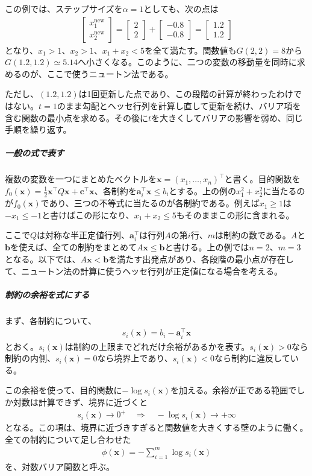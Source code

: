\documentclass[a4j]{jarticle}
\begin{document}
この例では、ステップサイズを$\alpha=1$としても、次の点は
\begin{align}
  \begin{bmatrix}x_1^{\mathrm{new}}\\x_2^{\mathrm{new}}\end{bmatrix}
  =\begin{bmatrix}2\\2\end{bmatrix}
   +\begin{bmatrix}-0.8\\-0.8\end{bmatrix}
  =\begin{bmatrix}1.2\\1.2\end{bmatrix}
\end{align}
となり、$x_1>1$、$x_2>1$、$x_1+x_2<5$を全て満たす。関数値も$G(2,2)=8$から$G(1.2,1.2)\simeq5.14$へ小さくなる。このように、二つの変数の移動量を同時に求めるのが、ここで使うニュートン法である。

ただし、$(1.2,1.2)$は1回更新した点であり、この段階の計算が終わったわけではない。$t=1$のまま勾配とヘッセ行列を計算し直して更新を続け、バリア項を含む関数の最小点を求める。その後に$t$を大きくしてバリアの影響を弱め、同じ手順を繰り返す。

\subparagraph{一般の式で表す}
複数の変数を一つにまとめたベクトルを$\bm{x}=(x_1,\ldots,x_n)^\top$と書く。目的関数を$f_0(\bm{x})=\frac12\bm{x}^\top Q\bm{x}+\bm{c}^\top \bm{x}$、各制約を$\bm{a}_i^\top \bm{x}\le b_i$とする。上の例の$x_1^2+x_2^2$に当たるのが$f_0(\bm{x})$であり、三つの不等式に当たるのが各制約である。例えば$x_1\ge1$は$-x_1\le-1$と書けばこの形になり、$x_1+x_2\le5$もそのままこの形に含まれる。

ここで$Q$は対称な半正定値行列、$\bm{a}_i^\top$は行列$A$の第$i$行、$m$は制約の数である。$A$と$\bm{b}$を使えば、全ての制約をまとめて$A\bm{x}\le \bm{b}$と書ける。上の例では$n=2$、$m=3$となる。以下では、$A\bm{x}<\bm{b}$を満たす出発点があり、各段階の最小点が存在して、ニュートン法の計算に使うヘッセ行列が正定値になる場合を考える。

\subparagraph{制約の余裕を式にする}
まず、各制約について、
\begin{align}
  s_i(\bm{x})=b_i-\bm{a}_i^\top \bm{x}
  \label{eq:barrier-slack}
\end{align}
とおく。$s_i(\bm{x})$は制約の上限までどれだけ余裕があるかを表す。$s_i(\bm{x})>0$なら制約の内側、$s_i(\bm{x})=0$なら境界上であり、$s_i(\bm{x})<0$なら制約に違反している。

この余裕を使って、目的関数に$-\log s_i(\bm{x})$を加える。余裕が正である範囲でしか対数は計算できず、境界に近づくと
\begin{align}
  s_i(\bm{x})\to0^+\quad\Longrightarrow\quad-\log s_i(\bm{x})\to+\infty
\end{align}
となる。この項は、境界に近づきすぎると関数値を大きくする壁のように働く。全ての制約について足し合わせた
\begin{align}
  \phi(\bm{x})=-\sum_{i=1}^{m}\log s_i(\bm{x})
\end{align}
を、対数バリア関数と呼ぶ。
\end{document}
